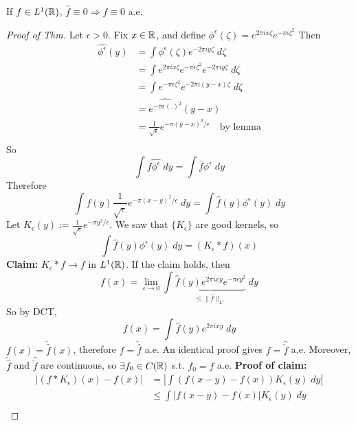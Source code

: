 \begin{cor}
    If $ f \in L^1(\mathbb{R})$, $\hat{f} \equiv 0 \Rightarrow f \equiv 0$ a.e. 
\end{cor}
\begin{proof}[Proof of Thm]
    Let $\epsilon > 0$. Fix $x \in \mathbb{R}$, and define $\phi^\epsilon(\zeta) = e^{2 \pi i x \zeta} e^{- \pi \epsilon \zeta^2}$ 
    Then
    \begin{align*}
        \hat{\phi^{\epsilon}}(y) &= \int \phi^{\epsilon}(\zeta) e^{-2 \pi i y \zeta} \; d \zeta \\
        &= \int e^{2 \pi i x \zeta} e^{- \pi \epsilon \zeta^2} e^{-2 \pi i y \zeta} \; d \zeta \\
        &= \int e^{- \pi \epsilon \zeta^2} e^{- 2 \pi i (y - x) \zeta} \; d \zeta \\
        &= \widehat{e^{-\pi \epsilon (.)^2}}(y - x) \\
        &= \frac{1}{\sqrt{\epsilon}} e^{-\pi (y - x)^2 / \epsilon} \quad \text{by lemma}\\
    \end{align*}   
    So 
    \[
        \int f \hat{\phi^\epsilon} \; dy = \int \hat{f} \phi^\epsilon \; dy
    \] 
    Therefore 
    \[
        \int f(y) \frac{1}{\sqrt{\epsilon}} e^{-\pi (x-y)^2 / \epsilon} \; dy = \int \hat{f}(y) \phi^\epsilon(y) \; dy
    \] 
    Let $K_\epsilon(y) := \frac{1}{\sqrt{\epsilon}} e^{-\pi y^2 / \epsilon}$. We saw that $\{ K_\epsilon\}$ are good kernels,
    so 
    \[
        \int \hat{f}(y) \phi^{\epsilon}(y) \; dy = (K_\epsilon * f)(x)
    \]   
    \textbf{Claim:} $K_\epsilon * f \to f$ in $L^1(\mathbb{R})$.
    \newline \noindent If the claim holds, then
    \[
        f(x) = \lim_{\epsilon \to 0} \int \underbrace{\hat{f}(y) e^{2 \pi i x y} e^{- \pi \epsilon y^2}}_{\leq \|\hat{f}\|_{L^1}} \; dy
    \]  
    So by DCT,
    \[
        f(x) = \int \hat{f}(y) e^{2 \pi i x y} \; dy 
    \]  
    $f(x) = \check{\hat{f}}(x)$, therefore $f = \check{\hat{f}}$ a.e.
    An identical proof gives $f = \hat{\check{f}}$ a.e. Moreover, $\check{\hat{f}}$ and $\hat{\check{f}}$ are continuous,
    so $\exists f_0 \in C(\mathbb{R})$ s.t. $f_0 = f$ a.e.
    \newline \noindent \textbf{Proof of claim:} 
    \newline \noindent \begin{align*}
        |(f * K_\epsilon)(x) - f(x)| &= \left| \int (f(x-y) - f(x)) K_\epsilon(y) \; dy \right| \\
        &\leq \int |f(x-y) - f(x)| K_\epsilon(y) \; dy \\ 

\end{align*}
\end{proof}
